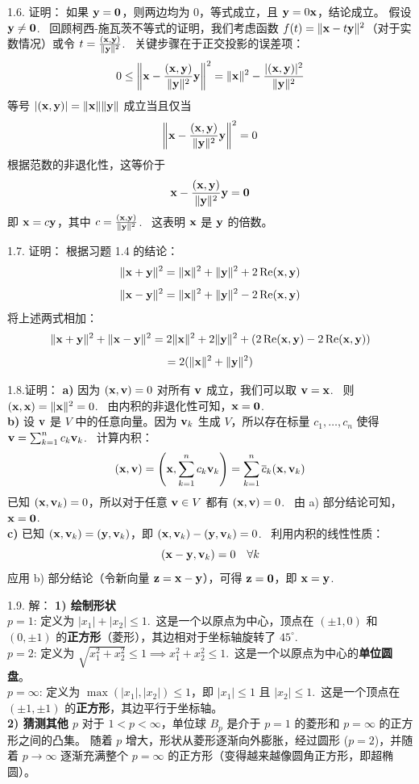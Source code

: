 \begin{exer}
1.6. 证明：
如果 $\mathbf{y} = \mathbf{0}$，则两边均为 0，等式成立，且 $\mathbf{y} = 0\mathbf{x}$，结论成立。
假设 $\mathbf{y} \neq \mathbf{0}$.~
回顾柯西-施瓦茨不等式的证明，我们考虑函数 $f(t) = \|\mathbf{x} - t\mathbf{y}\|^2$（对于实数情况）或令 $t = \frac{(\mathbf{x}, \mathbf{y})}{\|\mathbf{y}\|^2}$.~
关键步骤在于正交投影的误差项：
$$ 0 \le \left\| \mathbf{x} - \frac{(\mathbf{x}, \mathbf{y})}{\|\mathbf{y}\|^2} \mathbf{y} \right\|^2 = \|\mathbf{x}\|^2 - \frac{|(\mathbf{x}, \mathbf{y})|^2}{\|\mathbf{y}\|^2} $$
等号 $|(\mathbf{x}, \mathbf{y})| = \|\mathbf{x}\| \|\mathbf{y}\|$ 成立当且仅当
$$ \left\| \mathbf{x} - \frac{(\mathbf{x}, \mathbf{y})}{\|\mathbf{y}\|^2} \mathbf{y} \right\|^2 = 0 $$
根据范数的非退化性，这等价于
$$ \mathbf{x} - \frac{(\mathbf{x}, \mathbf{y})}{\|\mathbf{y}\|^2} \mathbf{y} = \mathbf{0} $$
即 $\mathbf{x} = c \mathbf{y}$，其中 $c = \frac{(\mathbf{x}, \mathbf{y})}{\|\mathbf{y}\|^2}$.~
这表明 $\mathbf{x}$ 是 $\mathbf{y}$ 的倍数。

1.7. 证明：
根据习题 1.4 的结论：
$$ \|\mathbf{x} + \mathbf{y}\|^2 = \|\mathbf{x}\|^2 + \|\mathbf{y}\|^2 + 2\operatorname{Re}(\mathbf{x}, \mathbf{y}) $$
$$ \|\mathbf{x} - \mathbf{y}\|^2 = \|\mathbf{x}\|^2 + \|\mathbf{y}\|^2 - 2\operatorname{Re}(\mathbf{x}, \mathbf{y}) $$
将上述两式相加：
$$ \|\mathbf{x} + \mathbf{y}\|^2 + \|\mathbf{x} - \mathbf{y}\|^2 = 2\|\mathbf{x}\|^2 + 2\|\mathbf{y}\|^2 + (2\operatorname{Re}(\mathbf{x}, \mathbf{y}) - 2\operatorname{Re}(\mathbf{x}, \mathbf{y})) $$
$$ = 2(\|\mathbf{x}\|^2 + \|\mathbf{y}\|^2) $$

1.8.证明：
\textbf{a)}
因为 $(\mathbf{x}, \mathbf{v}) = 0$ 对所有 $\mathbf{v}$ 成立，我们可以取 $\mathbf{v} = \mathbf{x}$.~
则 $(\mathbf{x}, \mathbf{x}) = \|\mathbf{x}\|^2 = 0$.~
由内积的非退化性可知，$\mathbf{x} = \mathbf{0}$.~
\\
\textbf{b)}
设 $\mathbf{v}$ 是 $V$ 中的任意向量。因为 $\mathbf{v}_k$ 生成 $V$，所以存在标量 $c_1, \dots, c_n$ 使得 $\mathbf{v} = \sum_{k=1}^n c_k \mathbf{v}_k$.~
计算内积：
$$ (\mathbf{x}, \mathbf{v}) = \left( \mathbf{x}, \sum_{k=1}^n c_k \mathbf{v}_k \right) = \sum_{k=1}^n \overline{c}_k (\mathbf{x}, \mathbf{v}_k) $$
已知 $(\mathbf{x}, \mathbf{v}_k) = 0$，所以对于任意 $\mathbf{v} \in V$ 都有 $(\mathbf{x}, \mathbf{v}) = 0$.~
由 a) 部分结论可知，$\mathbf{x} = \mathbf{0}$.~
\\
\textbf{c)}
已知 $(\mathbf{x}, \mathbf{v}_k) = (\mathbf{y}, \mathbf{v}_k)$，即 $(\mathbf{x}, \mathbf{v}_k) - (\mathbf{y}, \mathbf{v}_k) = 0$.~
利用内积的线性性质：
$$ (\mathbf{x} - \mathbf{y}, \mathbf{v}_k) = 0 \quad \forall k $$
应用 b) 部分结论（令新向量 $\mathbf{z} = \mathbf{x} - \mathbf{y}$），可得 $\mathbf{z} = \mathbf{0}$，即 $\mathbf{x} = \mathbf{y}$.~

1.9. 解：
\textbf{1) 绘制形状}\\
$p=1$: 定义为 $|x_1| + |x_2| \le 1$.~这是一个以原点为中心，顶点在 $(\pm 1, 0)$ 和 $(0, \pm 1)$ 的\textbf{正方形}（菱形），其边相对于坐标轴旋转了 $45^\circ$.~\\
$p=2$: 定义为 $\sqrt{x_1^2 + x_2^2} \le 1 \implies x_1^2 + x_2^2 \le 1$.~这是一个以原点为中心的\textbf{单位圆盘}。\\
$p=\infty$: 定义为 $\max(|x_1|, |x_2|) \le 1$，即 $|x_1| \le 1$ 且 $|x_2| \le 1$.~这是一个顶点在 $(\pm 1, \pm 1)$ 的\textbf{正方形}，其边平行于坐标轴。
\\
\textbf{2) 猜测其他 $p$}
对于 $1 < p < \infty$，单位球 $B_p$ 是介于 $p=1$ 的菱形和 $p=\infty$ 的正方形之间的凸集。
随着 $p$ 增大，形状从菱形逐渐向外膨胀，经过圆形 ($p=2$)，并随着 $p \to \infty$ 逐渐充满整个 $p=\infty$ 的正方形（变得越来越像圆角正方形，即超椭圆）。




\end{exer}
